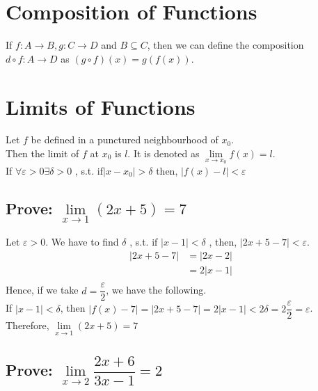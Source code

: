 \documentclass[fleqn]{article}
\begin{document}
\section{Composition of Functions}

If $f : A \rightarrow B, g : C \rightarrow D$ and $B \subseteq C$, then we can define the composition $d \circ f : A \rightarrow D$ as $(g \circ f)(x) = g(f(x))$.

\section{Limits of Functions}

Let $f$ be defined in a punctured neighbourhood of $x_0$.\\
Then the limit of $f$ at $x_0$ is $l$. It is denoted as $\lim\limits_{x \rightarrow x_0} f(x) = l$.\\
If $ \forall \varepsilon > 0 \exists \delta > 0$ , s.t. if$|x - x_0| > \delta$ then, $|f(x) - l| < \varepsilon$

\subsection{Prove: $\lim\limits_{x \rightarrow 1} (2x + 5) = 7$}

Let $\varepsilon > 0$. We have to find $\delta$ , s.t. if $|x - 1| < \delta$ , then, $|2x + 5 - 7| < \varepsilon$.
\begin{align*}
	|2x + 5 - 7| &= |2x - 2|\\
	&= 2|x - 1|\\
\end{align*}
Hence, if we take $d = \dfrac{\varepsilon}{2}$, we have the following.\\
If $|x - 1| < \delta$, then $|f(x) - 7| = |2x + 5 - 7| = 2|x - 1| < 2 \delta = 2 \dfrac{\varepsilon}{2} = \varepsilon$.\\
Therefore, $\lim\limits_{x \rightarrow 1} (2x + 5) = 7$

\subsection{Prove: $\lim\limits_{x \rightarrow 2} \dfrac{2x + 6}{3x - 1} = 2$}
\end{document}
